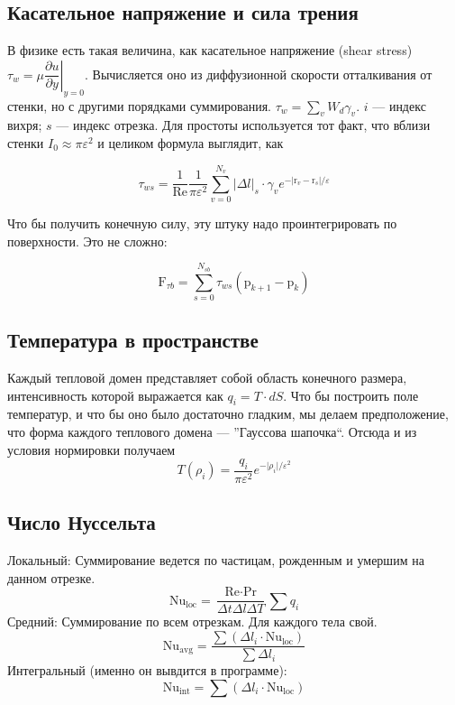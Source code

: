 \documentclass[14pt]{extreport}
\newcommand{\br}[1]{\boldsymbol{\mathrm{#1}}}
\renewcommand{\vec}[1]{\br{#1}}
\newcommand{\Reyn}{\text{Re}}
\newcommand{\Pran}{\text{Pr}}
\newcommand{\Nuss}{\text{Nu}}
\begin{document}
\subsection{Касательное напряжение и сила трения}

В физике есть такая величина, как касательное напряжение (shear stress) $\tau_w = \mu \left. \dfrac{\partial u}{\partial y} \right|_{y=0}$. Вычисляется оно из диффузионной скорости отталкивания от стенки, но с другими порядками суммирования. $ \tau_w = \sum_v {W_d \gamma_v}$. $i$ --- индекс вихря; $s$ --- индекс отрезка. Для простоты используется тот факт, что вблизи стенки $I_0 \approx \pi\varepsilon^2$ и целиком формула выглядит, как

$$ \tau_{ws} = \dfrac{1}{\Reyn}\dfrac{1}{\pi\varepsilon^2} \sum\limits_{v=0}^{N_v} |\Delta l|_s\cdot \gamma_v e^{-\lvert\vec r_v- \vec r_s\rvert/\varepsilon}$$

Что бы получить конечную силу, эту штуку надо проинтегрировать по поверхности. Это не сложно:

$$ \br F_{\tau b} = \sum_{s=0}^{N_{sb}} {\tau_{ws} (\br p_{k+1} - \br p_k) } $$

\subsection{Температура в пространстве}
Каждый тепловой домен представляет собой область конечного размера, интенсивность которой выражается как $q_i = T \cdot dS$. Что бы построить поле температур, и что бы оно было достаточно гладким, мы делаем предположение, что форма каждого теплового домена --- ''Гауссова шапочка``. Отсюда и из условия нормировки получаем
$$T(\rho_i) = \dfrac{q_i}{\pi \varepsilon^2} e^{-\lvert \rho_i \rvert / \varepsilon^2}$$

\subsection{Число Нуссельта}

Локальный: Суммирование ведется по частицам, рожденным и умершим на данном отрезке.
$$\Nuss_\text{loc} = \dfrac{\Reyn \cdot \Pran}{\Delta t \Delta l \Delta T} \sum q_i$$
Средний: Суммирование по всем отрезкам. Для каждого тела свой.
$$\Nuss_\text{avg} = \dfrac{\sum (\Delta l_i \cdot \Nuss_\text{loc})}{\sum \Delta l_i}$$
Интегральный (именно он вывдится в программе):
$$\Nuss_\text{int} = \sum ( \Delta l_i \cdot \Nuss_\text{loc})$$
\end{document}
